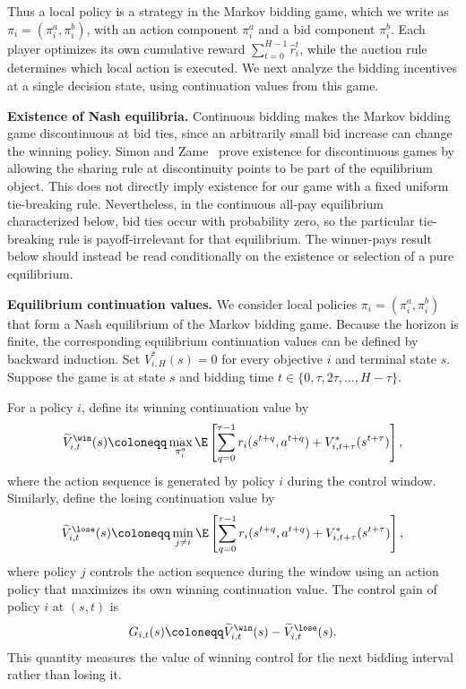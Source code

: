Thus a local policy is a strategy in the Markov bidding game, which we write as \(\pi_i=(\pi_i^a,\pi_i^b)\), with an action component \(\pi_i^a\) and a bid component \(\pi_i^b\).
Each player optimizes its own cumulative reward \(\sum_{t=0}^{H-1}\hat r_i^t\), while the auction rule determines which local action is executed.
We next analyze the bidding incentives at a single decision state, using continuation values from this game.

\smallskip
\noindent\textbf{Existence of Nash equilibria.}
Continuous bidding makes the Markov bidding game discontinuous at bid ties, since an arbitrarily small bid increase can change the winning policy.
Simon and Zame~\citep{simon1990discontinuous} prove existence for discontinuous games by allowing the sharing rule at discontinuity points to be part of the equilibrium object.
This does not directly imply existence for our game with a fixed uniform tie-breaking rule.
Nevertheless, in the continuous all-pay equilibrium characterized below, bid ties occur with probability zero, so the particular tie-breaking rule is payoff-irrelevant for that equilibrium.
The winner-pays result below should instead be read conditionally on the existence or selection of a pure equilibrium.

\smallskip
\noindent\textbf{Equilibrium continuation values.}
We consider local policies \(\pi_i=(\pi_i^a,\pi_i^b)\) that form a Nash equilibrium of the Markov bidding game.
Because the horizon is finite, the corresponding equilibrium continuation values can be defined by backward induction.
Set \(V^*_{i,H}(s)=0\) for every objective \(i\) and terminal state \(s\).
Suppose the game is at state \(s\) and bidding time \(t\in\{0,\tau,2\tau,\ldots,H-\tau\}\).

For a policy \(i\), define its winning continuation value by
\begin{equation}
	\widetilde V^{\win}_{i,t}(s)
	\coloneqq
	\max_{\pi_i^a}
	\E\left[
		\sum_{q=0}^{\tau-1} r_i(s^{t+q},a^{t+q})
		+V^*_{i,t+\tau}(s^{t+\tau})
	\right],
\end{equation}
where the action sequence is generated by policy \(i\) during the control window.
Similarly, define the losing continuation value by
\begin{equation}
	\widetilde V^{\lose}_{i,t}(s)
	\coloneqq
	\min_{j\neq i}
	\E\left[
		\sum_{q=0}^{\tau-1} r_i(s^{t+q},a^{t+q})
		+V^*_{i,t+\tau}(s^{t+\tau})
	\right],
\end{equation}
where policy \(j\) controls the action sequence during the window using an action policy that maximizes its own winning continuation value.
The control gain of policy \(i\) at \((s,t)\) is
\begin{equation}
	G_{i,t}(s)
	\coloneqq
	\widetilde V^{\win}_{i,t}(s)-\widetilde V^{\lose}_{i,t}(s).
\end{equation}
This quantity measures the value of winning control for the next bidding interval rather than losing it.

